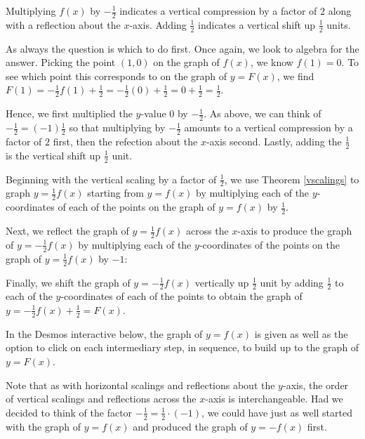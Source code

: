 \documentclass{ximera}
\begin{document}
\begin{example}
\begin{enumerate}
\begin{enumerate}
 \smallskip
 
 Multiplying $f(x)$ by $-\frac{1}{2}$ indicates a vertical compression by a factor of $2$ along with a reflection about the $x$-axis.  Adding $\frac{1}{2}$ indicates a vertical shift up $\frac{1}{2}$ units.  
 
 \smallskip
 
 As always the question is which to do first.  Once again, we look to algebra for the answer.  Picking the point $(1,0)$  on the graph of $f(x)$, we know $f(1) = 0$.  To see which point this corresponds to on the graph of $y=F(x)$, we find  $F(1) = -\frac{1}{2}f(1)+\frac{1}{2} = -\frac{1}{2} (0) +\frac{1}{2} = 0 + \frac{1}{2} = \frac{1}{2}$.  
 
 \smallskip
 
 Hence, we first multiplied the $y$-value $0$ by $-\frac{1}{2}$.  As above, we can think of $-\frac{1}{2} = (-1) \frac{1}{2}$  so that multiplying by $-\frac{1}{2}$ amounts to a vertical compression by a factor of $2$ first, then the refection about the $x$-axis second.  Lastly, adding the $\frac{1}{2}$ is the vertical shift up $\frac{1}{2}$ unit.  
 
 \smallskip
 
Beginning with the vertical scaling by a factor of $\frac{1}{2}$, we use Theorem \ref{vscalings} to graph $y=\frac{1}{2} f(x)$ starting from $y=f(x)$ by multiplying each of the $y$-coordinates of each of the points on the graph of $y=f(x)$ by $\frac{1}{2}$.
  
Next, we reflect the graph of $y = \frac{1}{2} f(x)$ across the $x$-axis to produce the graph of $y=-\frac{1}{2} f(x)$ by multiplying each of the $y$-coordinates of the points on the graph of $y=\frac{1}{2} f(x)$ by $-1$:

Finally, we shift the graph of $y = -\frac{1}{2} f(x)$ vertically up $\frac{1}{2}$ unit by adding $\frac{1}{2}$ to each of the $y$-coordinates of each of the points to obtain the graph of $y = -\frac{1}{2}f(x)+\frac{1}{2} = F(x)$.

In the Desmos interactive below, the graph of $y=f(x)$ is given as well as the option to click on each intermediary step, in sequence, to build up to the graph of $y=F(x)$.  


 \begin{center}
 \end{center}
 

Note that as with horizontal scalings and reflections about the $y$-axis, the order of vertical scalings and reflections across the $x$-axis is interchangeable.  Had we decided to think of the factor $-\frac{1}{2} = \frac{1}{2} \cdot (-1)$, we could have just as well started with the graph of $y=f(x)$ and produced the graph of $y=-f(x)$ first.


\end{enumerate}
\end{enumerate}
\end{example}
\end{document}
